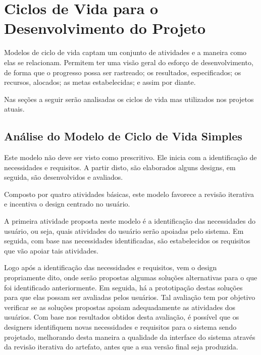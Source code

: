 \chapter[Ciclos de Vida para o Desenvolvimento do Projeto]{Ciclos de Vida para o Desenvolvimento do Projeto}
\label{chap:cicloDeVida}

	Modelos de ciclo de vida captam um conjunto de atividades e a maneira como elas se relacionam. Permitem ter uma visão geral do esforço de desenvolvimento, de forma que o progresso possa ser rastreado; os resultados, especificados; os recursos, alocados; as metas estabelecidas; e assim por diante.

	Nas seções a seguir serão analisadas os ciclos de vida mas utilizados nos projetos atuais.

	\section[Análise do Modelo Ciclo de Vida Simples]{Análise do Modelo de Ciclo de Vida Simples}
	\label{sec:cicloDeVida_Simples}

		Este modelo não deve ser visto como prescritivo. Ele inicia com a identificação de necessidades e requisitos. A partir disto, são elaborados alguns designs, em seguida, são desenvolvidos e avaliados.
		
		Composto por quatro atividades básicas, este modelo favorece a revisão iterativa e incentiva o design centrado no usuário.
		
		A primeira atividade proposta neste modelo é a identificação das necessidades do usuário, ou seja, quais atividades do usuário serão apoiadas pelo sistema. Em seguida, com base nas necessidades identificadas, são estabelecidos os requisitos que vão apoiar tais atividades.
		
		Logo após a identificação das necessidades e requisitos, vem o design propriamente dito, onde serão propostas algumas soluções alternativas para o que foi identificado anteriormente. Em seguida, há a prototipação destas soluções para que elas possam ser avaliadas pelos usuários. Tal avaliação tem por objetivo verificar se as soluções propostas apoiam adequadamente as atividades dos usuários. Com base nos resultados obtidos desta avaliação, é possível que os designers identifiquem novas necessidades e requisitos para o sistema sendo projetado, melhorando desta maneira a qualidade da interface do sistema através da revisão iterativa do artefato, antes que a sua versão final seja produzida.
		
